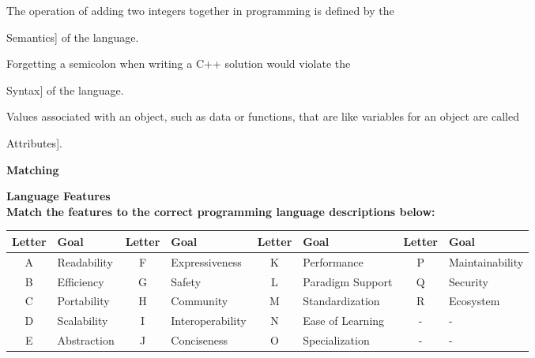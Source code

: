 \documentclass[12pt, addpoints, answers]{exam}
\newif\ifprintanswers
\newcommand{\fillin}[1]{%
  \ifprintanswers
    \textbf{#1}%
  \else
    \underline{\hspace{2mm}}%
  \fi
}
\begin{document}
\begin{questions}
\question The operation of adding two integers together in programming is defined by the \fillin[Semantics] of the language.

\question Forgetting a semicolon when writing a C++ solution would violate the  \fillin[Syntax] of the language.

\question Values associated with an object, such as data or functions, that are like variables for an object are called \fillin[Attributes].			
			
\newpage 
\Huge 
\hspace{-1.3cm}
\textbf{Matching}\\
\normalsize 

		
\LARGE 
\hspace{-1.3cm}
\textbf{Language Features}\\
\small 
\question \textbf{Match the features to the correct programming language descriptions below:}
	\begin{table}[H]
		\centering
		\setlength{\tabcolsep}{5pt} %
		\renewcommand{\arraystretch}{1.3} %
		\begin{tabular}{|c|l||c|l||c|l||c|l|}
			\hline
			\textbf{Letter} & \textbf{Goal} & \textbf{Letter} & \textbf{Goal}    & \textbf{Letter} & \textbf{Goal}    & \textbf{Letter} & \textbf{Goal}   \\
			\hline
			A               & Readability   & F               & Expressiveness   & K               & Performance      & P               & Maintainability \\ \hline
			B               & Efficiency    & G               & Safety           & L               & Paradigm Support & Q               & Security        \\ \hline
			C               & Portability   & H               & Community        & M               & Standardization  & R               & Ecosystem       \\ \hline
			D               & Scalability   & I               & Interoperability & N               & Ease of Learning & -               & -               \\ \hline
			E               & Abstraction   & J               & Conciseness      & O               & Specialization   & -               & -               
			\\ \hline
		\end{tabular}
	\end{table}
				

\end{questions}
\end{document}
